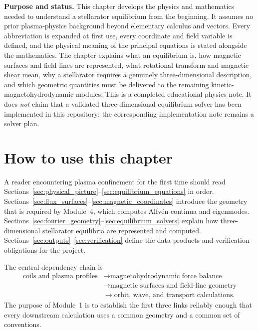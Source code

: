 \documentclass[11pt]{article}
\begin{document}

\begin{overviewbox}
\textbf{Purpose and status.} This chapter develops the physics and mathematics needed to understand a stellarator equilibrium from the beginning. It assumes no prior plasma-physics background beyond elementary calculus and vectors. Every abbreviation is expanded at first use, every coordinate and field variable is defined, and the physical meaning of the principal equations is stated alongside the mathematics. The chapter explains what an equilibrium is, how magnetic surfaces and field lines are represented, what rotational transform and magnetic shear mean, why a stellarator requires a genuinely three-dimensional description, and which geometric quantities must be delivered to the remaining kinetic-magnetohydrodynamic modules. This is a completed educational physics note. It does \emph{not} claim that a validated three-dimensional equilibrium solver has been implemented in this repository; the corresponding implementation note remains a solver plan.
\end{overviewbox}

\ProjectTOC

\section*{How to use this chapter}
A reader encountering plasma confinement for the first time should read Sections~\ref{sec:physical_picture}--\ref{sec:equilibrium_equations} in order. Sections~\ref{sec:flux_surfaces}--\ref{sec:magnetic_coordinates} introduce the geometry that is required by Module~4, which computes Alfv\'en continua and eigenmodes. Sections~\ref{sec:fourier_geometry}--\ref{sec:equilibrium_solvers} explain how three-dimensional stellarator equilibria are represented and computed. Sections~\ref{sec:outputs}--\ref{sec:verification} define the data products and verification obligations for the project.

The central dependency chain is
\begin{equation}
\begin{aligned}
\text{coils and plasma profiles}
&\longrightarrow \text{magnetohydrodynamic force balance}\\
&\longrightarrow \text{magnetic surfaces and field-line geometry}\\
&\longrightarrow \text{orbit, wave, and transport calculations}.
\end{aligned}
\end{equation}
The purpose of Module~1 is to establish the first three links reliably enough that every downstream calculation uses a common geometry and a common set of conventions.
\end{document}
